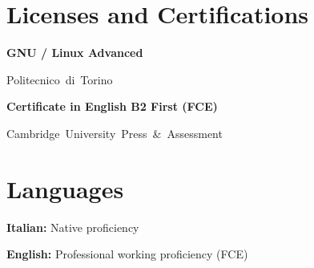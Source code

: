 
\begin{sidebysections}
    \section{Licenses and Certifications}
    
    \begin{onecolentry}
        \textbf{GNU / Linux Advanced}

        \vspace{0.10 cm}
        
        \mbox{Politecnico di Torino}
    \end{onecolentry}
    
    \vspace{0.2 cm}
    
    \begin{onecolentry}
        \textbf{Certificate in English B2 First (FCE)}
        
        \vspace{0.10 cm}
        
        \mbox{Cambridge University Press \& Assessment}
    \end{onecolentry}
    
    \switchsection

    \vspace{0.05cm}
    
    \section{Languages}
    
    \begin{onecolentry}
        \textbf{Italian:} Native proficiency
    \end{onecolentry}
    
    \vspace{0.2 cm}
    
    \begin{onecolentry}
        \textbf{English:} Professional working proficiency (FCE)
    \end{onecolentry}
\end{sidebysections}
